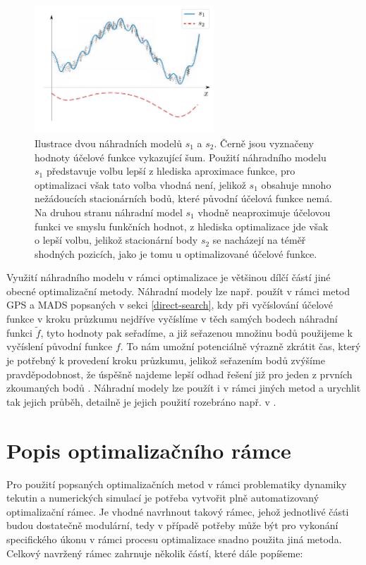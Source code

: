 \begin{figure}[H]
	\centering
	\includegraphics[width=0.6\textwidth]{Images/surrogate.pdf}
	\caption{Ilustrace dvou náhradních modelů $ s_1 $ a $ s_2 $. Černě jsou vyznačeny hodnoty účelové funkce vykazující šum. Použití náhradního modelu $ s_1 $ představuje volbu lepší z hlediska aproximace funkce, pro optimalizaci však tato volba vhodná není, jelikož $ s_1 $ obsahuje mnoho nežádoucích stacionárních bodů, které původní účelová funkce nemá. Na druhou stranu náhradní model $ s_1$ vhodně neaproximuje účelovou funkci ve smyslu funkčních hodnot, z hlediska optimalizace jde však o lepší volbu, jelikož stacionární body $ s_2$ se nacházejí na téměř shodných pozicích, jako je tomu u optimalizované účelové funkce.}
	\label{fig:surrogate}
\end{figure}

Využití náhradního modelu v rámci optimalizace je většinou dílčí částí jiné obecné optimalizační metody. Náhradní modely lze např. použít v rámci metod GPS a MADS popsaných v sekci \ref{direct-search}, kdy při vyčíslování účelové funkce v kroku průzkumu nejdříve vyčíslíme v těch samých bodech náhradní funkci $ \tilde{f} $, tyto hodnoty pak seřadíme, a již seřazenou množinu bodů použijeme k vyčíslení původní funkce $ f $. To nám umožní potenciálně výrazně zkrátit čas, který je potřebný k provedení kroku průzkumu, jelikož seřazením bodů zvýšíme pravděpodobnost, že úspěšně najdeme lepší odhad řešení již pro jeden z prvních zkoumaných bodů \cite{BBO-textbook}. Náhradní modely lze použít i v rámci jiných metod a urychlit tak jejich průběh, detailně je jejich použití rozebráno např. v \cite{two-decades, BBO-textbook}.


\section{Popis optimalizačního rámce}\label{ramec}
Pro použití popsaných optimalizačních metod v rámci problematiky dynamiky tekutin a numerických simulací je potřeba vytvořit plně automatizovaný optimalizační rámec. Je vhodné navrhnout takový rámec, jehož jednotlivé části budou dostatečně modulární, tedy v případě potřeby může být pro vykonání specifického úkonu v rámci procesu optimalizace snadno použita jiná metoda. Celkový navržený rámec zahrnuje několik částí, které dále popíšeme:

